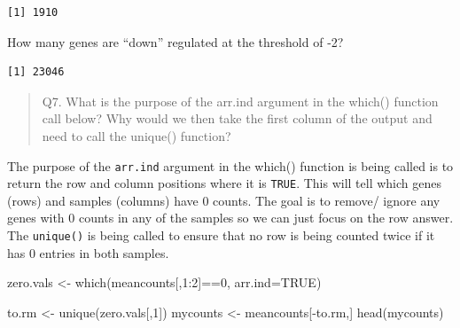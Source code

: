 \documentclass[
  letterpaper,
  DIV=11,
  numbers=noendperiod]{scrartcl}
\newenvironment{Shaded}{\begin{snugshade}}{\end{snugshade}}
\newcommand{\AttributeTok}[1]{\textcolor[rgb]{0.40,0.45,0.13}{#1}}
\newcommand{\ConstantTok}[1]{\textcolor[rgb]{0.56,0.35,0.01}{#1}}
\newcommand{\DecValTok}[1]{\textcolor[rgb]{0.68,0.00,0.00}{#1}}
\newcommand{\FunctionTok}[1]{\textcolor[rgb]{0.28,0.35,0.67}{#1}}
\newcommand{\NormalTok}[1]{\textcolor[rgb]{0.00,0.23,0.31}{#1}}
\newcommand{\OtherTok}[1]{\textcolor[rgb]{0.00,0.23,0.31}{#1}}
\newcommand{\SpecialCharTok}[1]{\textcolor[rgb]{0.37,0.37,0.37}{#1}}
\begin{document}
\begin{verbatim}
[1] 1910
\end{verbatim}

How many genes are ``down'' regulated at the threshold of -2?

\begin{Shaded}
\end{Shaded}

\begin{verbatim}
[1] 23046
\end{verbatim}

\begin{quote}
Q7. What is the purpose of the arr.ind argument in the which() function
call below? Why would we then take the first column of the output and
need to call the unique() function?
\end{quote}

The purpose of the \texttt{arr.ind} argument in the which() function is
being called is to return the row and column positions where it is
\texttt{TRUE}. This will tell which genes (rows) and samples (columns)
have 0 counts. The goal is to remove/ ignore any genes with 0 counts in
any of the samples so we can just focus on the row answer. The
\texttt{unique()} is being called to ensure that no row is being counted
twice if it has 0 entries in both samples.

\begin{Shaded}
\begin{Highlighting}[]
\NormalTok{zero.vals }\OtherTok{\textless{}{-}} \FunctionTok{which}\NormalTok{(meancounts[,}\DecValTok{1}\SpecialCharTok{:}\DecValTok{2}\NormalTok{]}\SpecialCharTok{==}\DecValTok{0}\NormalTok{, }\AttributeTok{arr.ind=}\ConstantTok{TRUE}\NormalTok{)}

\NormalTok{to.rm }\OtherTok{\textless{}{-}} \FunctionTok{unique}\NormalTok{(zero.vals[,}\DecValTok{1}\NormalTok{])}
\NormalTok{mycounts }\OtherTok{\textless{}{-}}\NormalTok{ meancounts[}\SpecialCharTok{{-}}\NormalTok{to.rm,]}
\FunctionTok{head}\NormalTok{(mycounts)}
\end{Highlighting}
\end{Shaded}
\end{document}

